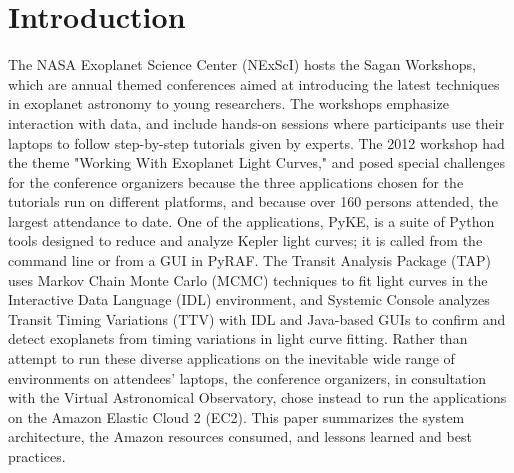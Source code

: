\begin{abstract}
We will describe the mechanisms for handling security, failovers, and licensing of commercial software. In particular, IDL licenses were managed through a server at Caltech, connected to the IDL instances running on Amazon EC2 via a Secure Shell (ssh) tunnel. The system operated flawlessly during the workshop.

\end {abstract}

\section{Introduction}
The NASA Exoplanet Science Center (NExScI) hosts the Sagan Workshops, which are annual themed conferences aimed at introducing the latest techniques in exoplanet astronomy to young researchers. The workshops emphasize interaction with data, and include hands-on sessions where participants use their laptops to follow step-by-step tutorials given by experts.  The 2012 workshop had the theme "Working With Exoplanet Light Curves," and posed special challenges for the conference organizers because the  three applications chosen for the tutorials run on different platforms, and because over 160 persons attended,  the largest attendance to date. One of the applications, PyKE, is a suite of Python tools designed to reduce and analyze Kepler light curves; it is called from the command line or from a GUI in PyRAF. The Transit Analysis Package (TAP) uses Markov Chain Monte Carlo (MCMC) techniques to fit light curves in the Interactive Data Language (IDL) environment, and Systemic Console analyzes Transit Timing Variations (TTV) with IDL and Java-based GUIs to confirm and detect exoplanets from timing variations in light curve fitting.  Rather than attempt to run these diverse applications on the inevitable wide range of environments on attendees' laptops, the conference organizers, in consultation with the Virtual Astronomical Observatory, chose instead to run the applications on the Amazon Elastic Cloud 2 (EC2). This paper summarizes the system architecture, the Amazon resources consumed, and lessons learned and best practices.

